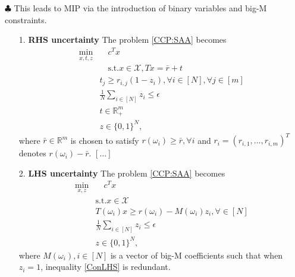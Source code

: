 \documentclass[11pt, oneside, reqno]{amsbook}
\begin{document}
$\clubsuit$ This leads to MIP via the introduction of binary variables and big-M constraints.

\begin{enumerate}
  \item[1.] \textbf{RHS uncertainty} 
The problem \eqref{CCP:SAA} becomes 
\begin{subequations}
\begin{align}
  \min_{x,t,z} & \quad c^T x \\
  & \quad \text{s.t.} x \in \mathcal{X}, Tx = \bar{r} + t \\
  & t_j \ge r_{i,j}(1-z_i), \forall i \in [N], \forall j \in [m] \\
  & \frac{1}{N} \sum_{i \in [N]} z_i \le \epsilon \\
  & t \in \mathbb{R}_+^m \\
  & z \in \{0,1\}^N,
\end{align}
\end{subequations}
where $\bar{r} \in \mathbb{R}^m$ is chosen to satisfy $r(\omega_i) \ge \bar{r}, \forall i $ and $r_i = (r_{i,1}, \dots, r_{i,m})^T$ denotes $r(\omega_i) - \bar{r}$. $[\dots]$

  \item[2.] \textbf{LHS uncertainty} 
The problem \eqref{CCP:SAA} becomes
\begin{subequations}
\begin{align}
  \min_{x,z} & \quad c^T x \\
  & \text{s.t.} x \in \mathcal{X} \\
  &  T(\omega_i)x \ge r(\omega_i) - M(\omega_i) z_i, \forall \in [N] \label{ConLHS}\\
  & \frac{1}{N} \sum_{i \in [N]} z_i \le \epsilon \\
  & z \in \{0,1 \}^N,
\end{align}
\end{subequations}
where $M(\omega_i), i \in [N]$ is a vector of big-M coefficients such that when $z_i=1$, inequality \eqref{ConLHS} is redundant.
\end{enumerate}







\end{document}
